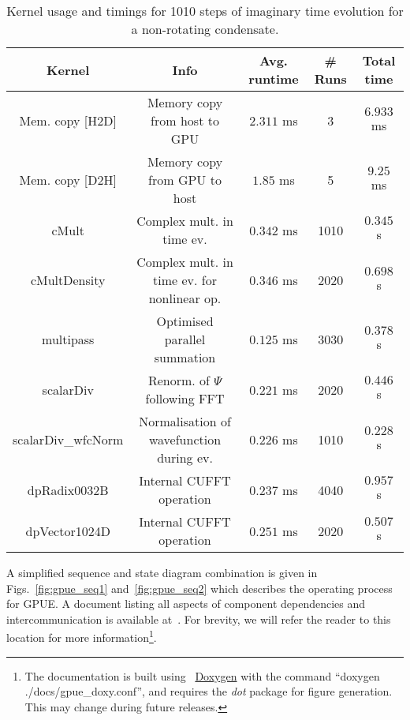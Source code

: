 \begin{table}
    \scriptsize
    \centering
\begin{tabular}{c|c|c|c|c}
\textbf{Kernel}  & \textbf{Info} & \textbf{Avg. runtime} & \textbf{\# Runs} & \textbf{Total time} \\
\hline
Mem. copy [H2D] & Memory copy from host to GPU & $2.311$ ms & 3 & $6.933$ ms\\
Mem. copy [D2H] & Memory copy from GPU to host & $1.85$ ms & 5 & $9.25$ ms\\
cMult & Complex mult. in time ev. & $0.342$ ms & 1010 & $0.345$ s\\
cMultDensity & Complex mult. in time ev. for nonlinear op. & $0.346$ ms & 2020 & $0.698$ s \\
multipass & Optimised parallel summation & $0.125$ ms & 3030 & $0.378$ s \\
scalarDiv & Renorm. of $\Psi$ following FFT & $0.221$ ms & 2020 & $0.446$ s \\
scalarDiv_wfcNorm & Normalisation of wavefunction during ev. & $0.226$ ms & 1010 & $0.228$ s\\
dpRadix0032B & Internal CUFFT operation & $0.237$ ms & 4040 & $0.957$ s \\
dpVector1024D & Internal CUFFT operation & $0.251$ ms & 2020 & $0.507$ s \\
\end{tabular}
\caption{Kernel usage and timings for 1010 steps of imaginary time evolution for a non-rotating condensate.}\label{tbl:gpue_im}
\end{table}

A simplified sequence and state diagram combination is given in Figs.~\ref{fig:gpue_seq1} and~\ref{fig:gpue_seq2} which describes the operating process for GPUE. A document listing all aspects of component dependencies and intercommunication is available at~\cite{MLXD_GPUE}. For brevity, we will refer the reader to this location for more information\footnote{The documentation is built using ~\href{http://www.stack.nl/~dimitri/doxygen/}{Doxygen} with the command ``doxygen ./docs/gpue_doxy.conf'', and requires the \textit{dot} package for figure generation. This may change during future releases.}.

